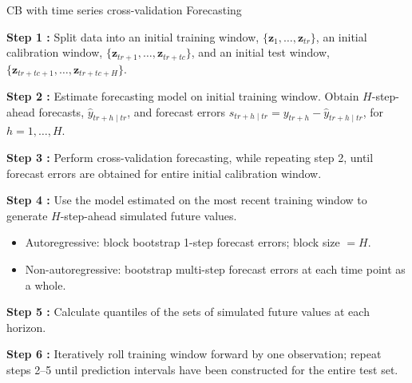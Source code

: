 \documentclass[
  12pt,
  ignorenonframetext,
  aspectratio=169,
]{beamer}
\begin{document}
\begin{frame}{CB with time series cross-validation Forecasting}
\label{cb-with-time-series-cross-validation-forecasting-1}
\begin{block}{}
\fontsize{9}{9}\sf
\color{blue} \textbf{Step 1 :} \color{black} Split data into an initial training window, $\{\bm{z}_{1}, \dots, \bm{z}_{tr}\}$, an initial calibration window, $\{\bm{z}_{tr + 1}, \dots, \bm{z}_{tr + tc}\}$, and an initial test window, $\{\bm{z}_{tr + tc + 1}, \dots, \bm{z}_{tr + tc + H}\}$.
\end{block}

\pause

\begin{block}{}
\fontsize{9}{9}\sf
\color{violet} \textbf{Step 2 :} \color{black} Estimate forecasting model on initial training window. Obtain $H$-step-ahead forecasts, $\hat{y}_{tr + h \mid tr}$, and forecast errors $s_{tr + h \mid tr} = y_{tr + h} - \hat{y}_{tr + h \mid tr}$, for $h = 1, \dots, H$.
\end{block}

\pause

\begin{block}{}
\fontsize{9}{9}\sf
\color{blue} \textbf{Step 3 :} \color{black} Perform cross-validation forecasting, while repeating step 2, until forecast errors are obtained for entire initial calibration window.
\end{block}

\pause

\begin{block}{}
\fontsize{9}{9}\sf
\color{violet} \textbf{Step 4 :} \color{black} Use the model estimated on the most recent training window to generate $H$-step-ahead simulated future values.
\begin{itemize}
  \item Autoregressive: block bootstrap 1-step forecast errors; block size $ = H$.
  \item Non-autoregressive: bootstrap multi-step forecast errors at each time point as a whole.
\end{itemize}
\end{block}

\pause

\begin{block}{}
\fontsize{9}{9}\sf
\color{blue} \textbf{Step 5 :} \color{black} Calculate quantiles of the sets of simulated future values at each horizon.
\end{block}

\pause

\begin{block}{}
\fontsize{9}{9}\sf
\color{violet} \textbf{Step 6 :} \color{black} Iteratively roll training window forward by one observation; repeat steps 2--5 until prediction intervals have been constructed for the entire test set. 
\end{block}
\end{frame}
\end{document}
